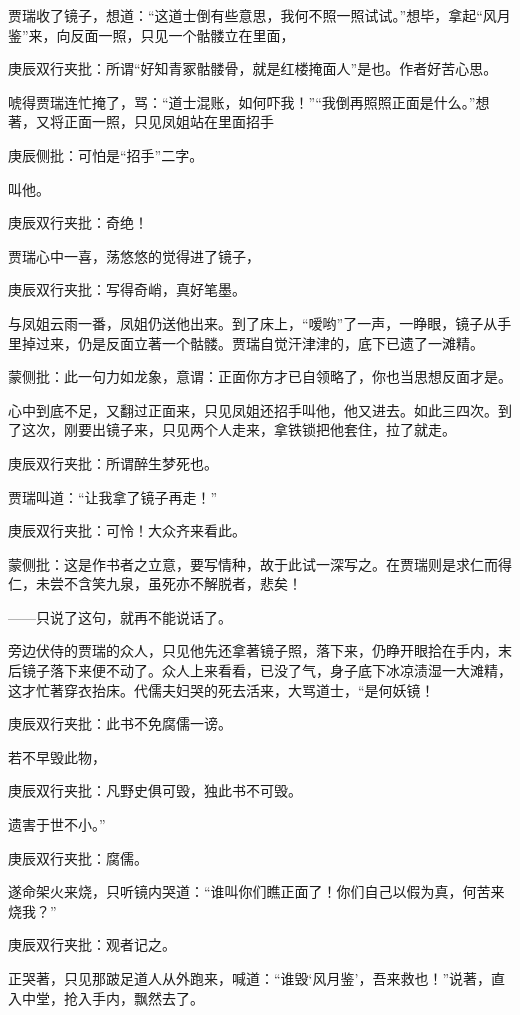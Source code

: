 \begin{parag}


    贾瑞收了镜子，想道：“这道士倒有些意思，我何不照一照试试。”想毕，拿起“风月鉴”来，向反面一照，只见一个骷髅立在里面，\begin{note}庚辰双行夹批：所谓“好知青冢骷髅骨，就是红楼掩面人”是也。作者好苦心思。\end{note}唬得贾瑞连忙掩了，骂：“道士混账，如何吓我！”“我倒再照照正面是什么。”想著，又将正面一照，只见凤姐站在里面招手\begin{note}庚辰侧批：可怕是“招手”二字。\end{note}叫他。\begin{note}庚辰双行夹批：奇绝！\end{note}贾瑞心中一喜，荡悠悠的觉得进了镜子，\begin{note}庚辰双行夹批：写得奇峭，真好笔墨。\end{note}与凤姐云雨一番，凤姐仍送他出来。到了床上，“嗳哟”了一声，一睁眼，镜子从手里掉过来，仍是反面立著一个骷髅。贾瑞自觉汗津津的，底下已遗了一滩精。\begin{note}蒙侧批：此一句力如龙象，意谓：正面你方才已自领略了，你也当思想反面才是。\end{note}心中到底不足，又翻过正面来，只见凤姐还招手叫他，他又进去。如此三四次。到了这次，刚要出镜子来，只见两个人走来，拿铁锁把他套住，拉了就走。\begin{note}庚辰双行夹批：所谓醉生梦死也。\end{note}贾瑞叫道：“让我拿了镜子再走！”\begin{note}庚辰双行夹批：可怜！大众齐来看此。\end{note}\begin{note}蒙侧批：这是作书者之立意，要写情种，故于此试一深写之。在贾瑞则是求仁而得仁，未尝不含笑九泉，虽死亦不解脱者，悲矣！\end{note}——只说了这句，就再不能说话了。
\end{parag}


\begin{parag}


    旁边伏侍的贾瑞的众人，只见他先还拿著镜子照，落下来，仍睁开眼拾在手内，末后镜子落下来便不动了。众人上来看看，已没了气，身子底下冰凉渍湿一大滩精，这才忙著穿衣抬床。代儒夫妇哭的死去活来，大骂道士，“是何妖镜！\begin{note}庚辰双行夹批：此书不免腐儒一谤。\end{note}若不早毁此物，\begin{note}庚辰双行夹批：凡野史俱可毁，独此书不可毁。\end{note}遗害于世不小。”\begin{note}庚辰双行夹批：腐儒。\end{note}遂命架火来烧，只听镜内哭道：“谁叫你们瞧正面了！你们自己以假为真，何苦来烧我？”\begin{note}庚辰双行夹批：观者记之。\end{note}正哭著，只见那跛足道人从外跑来，喊道：“谁毁‘风月鉴’，吾来救也！”说著，直入中堂，抢入手内，飘然去了。
\end{parag}


